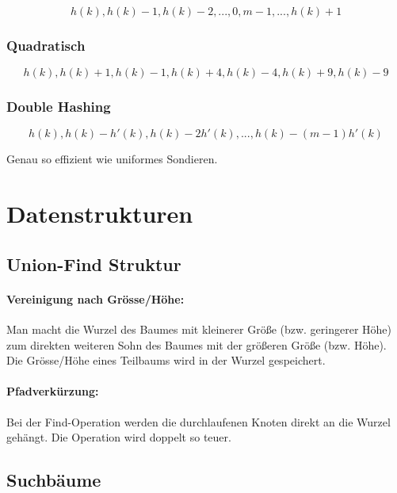 \documentclass[11pt]{article}
\begin{document}
\begin{equation*}
	h(k), h(k)-1, h(k)-2, ..., 0, m-1, ..., h(k)+1
\end{equation*}

\subsubsection{Quadratisch}

\begin{equation*}
	h(k), h(k)+1, h(k)-1, h(k)+4, h(k)-4, h(k)+9, h(k)-9
\end{equation*}

\subsubsection{Double Hashing}

\begin{equation*}
	h(k), h(k)-h'(k), h(k)-2h'(k), ..., h(k)-(m-1)h'(k)
\end{equation*}

Genau so effizient wie uniformes Sondieren.

\section{Datenstrukturen}

\subsection{Union-Find Struktur}

\paragraph{Vereinigung nach Grösse/Höhe:} Man macht die Wurzel des Baumes mit kleinerer Größe (bzw. geringerer Höhe) zum direkten weiteren Sohn des Baumes mit der größeren Größe (bzw. Höhe). \\
Die Grösse/Höhe eines Teilbaums wird in der Wurzel gespeichert.

\paragraph{Pfadverkürzung:} Bei der Find-Operation werden die durchlaufenen Knoten direkt an die Wurzel gehängt. Die Operation wird doppelt so teuer.

\subsection{Suchbäume}
\end{document}

